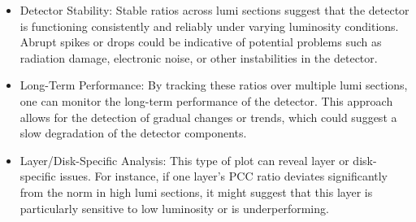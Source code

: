 \begin{itemize}
\item Detector Stability: Stable ratios across lumi sections suggest that the detector is functioning consistently and reliably under varying luminosity conditions. Abrupt spikes or drops could be indicative of potential problems such as radiation damage, electronic noise, or other instabilities in the detector.

\item Long-Term Performance: By tracking these ratios over multiple lumi sections, one can monitor the long-term performance of the detector. This approach allows for the detection of gradual changes or trends, which could suggest a slow degradation of the detector components.

\item Layer/Disk-Specific Analysis: This type of plot can reveal layer or disk-specific issues. For instance, if one layer's PCC ratio deviates significantly from the norm in high lumi sections, it might suggest that this layer is particularly sensitive to low luminosity or is underperforming.

\end{itemize}

